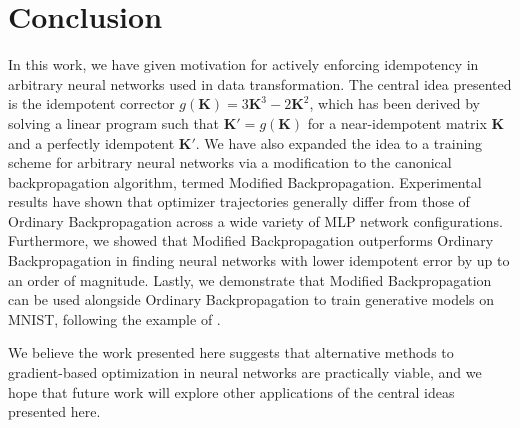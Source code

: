 \documentclass{article}
\theoremstyle{plain}
\theoremstyle{definition}
\theoremstyle{remark}
\newcommand{\vK}{\mathbf{K}}
\begin{document}
\section{Conclusion}
\label{sec:conclusion}
In this work, we have given motivation for actively enforcing idempotency in arbitrary neural networks used in data transformation. The central idea presented is the idempotent corrector ${g(\vK) = 3\vK^3 - 2\vK^2}$, which has been derived by solving a linear program such that ${\vK' = g(\vK)}$ for a near-idempotent matrix $\vK$ and a perfectly idempotent $\vK'$. We have also expanded the idea to a training scheme for arbitrary neural networks via a modification to the canonical backpropagation algorithm, termed Modified Backpropagation. Experimental results have shown that optimizer trajectories generally differ from those of Ordinary Backpropagation across a wide variety of MLP network configurations. Furthermore, we showed that Modified Backpropagation outperforms Ordinary Backpropagation in finding neural networks with lower idempotent error by up to an order of magnitude. Lastly, we demonstrate that Modified Backpropagation can be used alongside Ordinary Backpropagation to train generative models on MNIST, following the example of \citealt{shocher-ign}.

We believe the work presented here suggests that alternative methods to gradient-based optimization in neural networks are practically viable, and we hope that future work will explore other applications of the central ideas presented here.

%
%
\end{document}
